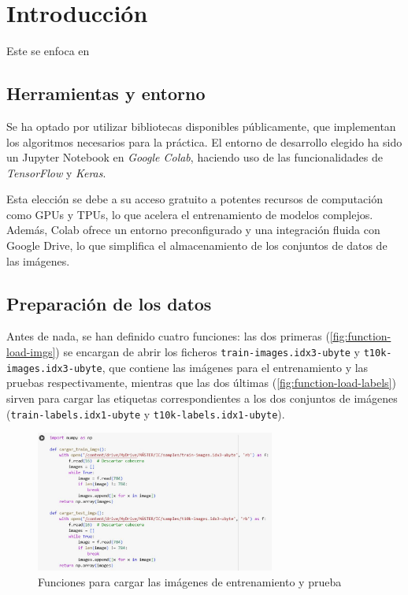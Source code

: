 \section{Introducción}
Este se enfoca en

\subsection{Herramientas y entorno}

Se ha optado por utilizar bibliotecas disponibles públicamente, que implementan los algoritmos necesarios para la práctica. El entorno de desarrollo elegido ha sido un Jupyter Notebook en \textit{Google Colab}, haciendo uso de las funcionalidades de \textit{TensorFlow} y \textit{Keras}.

Esta elección se debe a su acceso gratuito a potentes recursos de computación como GPUs y TPUs, lo que acelera el entrenamiento de modelos complejos. Además, Colab ofrece un entorno preconfigurado y una integración fluida con Google Drive, lo que simplifica el almacenamiento de los conjuntos de datos de las imágenes.

\subsection{Preparación de los datos}

Antes de nada, se han definido cuatro funciones: las dos primeras (\autoref{fig:function-load-imgs}) se encargan de abrir los ficheros \texttt{train-images.idx3-ubyte} y \texttt{t10k-images.idx3-ubyte}, que contiene las imágenes para el entrenamiento y las pruebas respectivamente, mientras que las dos últimas (\autoref{fig:function-load-labels}) sirven para cargar las etiquetas correspondientes a los dos conjuntos de imágenes (\texttt{train-labels.idx1-ubyte} y \texttt{t10k-labels.idx1-ubyte}).

\begin{figure}[H]
	\centering
	\includegraphics[width=0.7\textwidth]{imgs/function-load-imgs.JPG}
	\caption{Funciones para cargar las imágenes de entrenamiento y prueba}
	\label{fig:function-load-imgs}
\end{figure}

